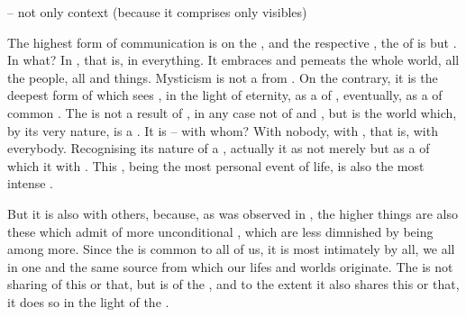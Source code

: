 {-- not only context (because it comprises only visibles)

\pa \inv
%
The highest form of communication is  on  
the , and the respective , the  
of  is but .
In what?  In , that is, in everything.  It embraces and
pemeats the whole world, all the people, all  and
 things.  Mysticism 
is not a  from .  On the contrary, it is
the deepest form of  which sees  
, 
in the light of eternity, 
as a  of ,
eventually, as a  of common .  The
 is not a result of , in any case not
of  and , but is the world
which, by its very nature, is a .  It is  -- with
whom?  With nobody, with , that is, with everybody. 
Recognising its nature of a ,  actually 
it as not merely  but as a 
of  which  it with .  This
, being the most personal event of 
life, is also the most intense . 

But it is also  with others, because, as was observed 
in , the higher things are also these which admit of more 
unconditional , which are less dimnished by being 
 among more. Since the  is common to all of 
us, it is most intimately  by all, we all  
in one and the same source from which our lifes and worlds originate. 
The  is not sharing of this or that, but is 
 of the , and to the extent it also shares this 
or that, it does so in the light of the . 

}
